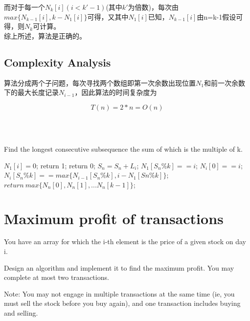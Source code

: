 \documentclass{article}
\begin{document}
而对于每一个$N_{k}[i](i<k'-1)$(其中$k'$为倍数)，每次由$max\{N_{k-1}[i],k-N_1[i]\}$可得，又其中$N_1[i]$已知，$N_{k-1}[i]$由n=k-1假设可得，则$N_{k}$可计算。
\\

综上所述，算法是正确的。

\subsection{Complexity Analysis}
算法分成两个子问题，每次寻找两个数组即第一次余数出现位置$N_1$和前一次余数下的最大长度记录$N_{i-1}$，因此算法的时间复杂度为

\begin{equation} 
T(n)=2*n=O(n)
\end{equation} 

\quad\\\\

\begin{algorithm}[htbp]  
  \caption{Find the longest consecutive subsequence the sum of which is the multiple of k.}  
  \begin{algorithmic}[1] 
	\State $N_1[i]=0$;
     \EndFor
	\State return 1;
	\EndIf
	\State return 0;
	\EndIf
	\State$S_n = S_n + L_i$;
	\State $N_1[S_n\%k] ==i$;
	\Else
	\State$N_i[0]==i$;
	\Else
	\State$N_i[S_n\%k]==max\{N_{i-1}[S_n\%k],i-N_1[Sn\%k]\}$;
	\EndIf
	\EndIf
	\EndFor
	\State$return\ max\{N_n[0], N_n[1],...N_n[k-1]\}$;
    \EndFunction  
  \end{algorithmic}  
\end{algorithm} 

\newpage
\section{Maximum profit of transactions}
You have an array for which the i-th element is the price of a given stock on day i.

Design an algorithm and implement it to find the maximum profit. You may complete at most two transactions.

Note: You may not engage in multiple transactions at the same time (ie, you must sell the stock before you buy again), and one transaction includes buying and selling.
\end{document}
